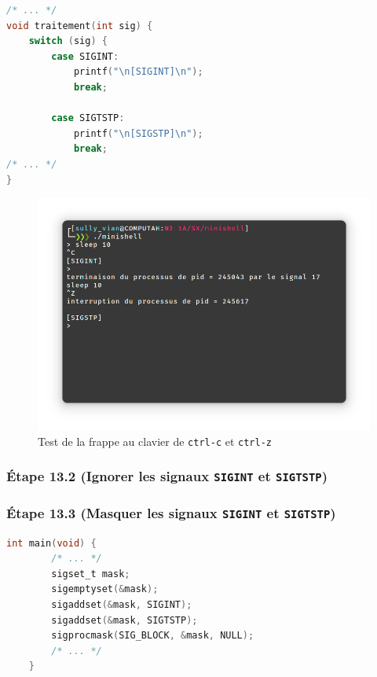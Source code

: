 \documentclass{article}
\begin{document}
\begin{lstlisting}[language=C, caption=ajout de la question 13.1]
/* ... */
void traitement(int sig) {
    switch (sig) {
        case SIGINT:
            printf("\n[SIGINT]\n");
            break;

        case SIGTSTP:
            printf("\n[SIGSTP]\n");
            break;
/* ... */
}
\end{lstlisting}

\begin{figure}[H]
    \centering
    \includegraphics[width=\textwidth]{./resources/E13.1.png}
    \caption{Test de la frappe au clavier de \texttt{ctrl-c} et \texttt{ctrl-z}}
\end{figure}

\subsubsection*{Étape 13.2 (Ignorer les signaux \texttt{SIGINT} et \texttt{SIGTSTP})}

\subsubsection*{Étape 13.3 (Masquer les signaux \texttt{SIGINT} et \texttt{SIGTSTP})}

\begin{lstlisting}[language=C, caption=ajout de la question 13.3]
    int main(void) {
        /* ... */
        sigset_t mask;
        sigemptyset(&mask);
        sigaddset(&mask, SIGINT);
        sigaddset(&mask, SIGTSTP);
        sigprocmask(SIG_BLOCK, &mask, NULL);
        /* ... */
    }
\end{lstlisting}
\end{document}
